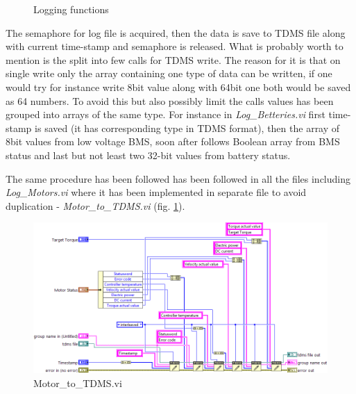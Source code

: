 \begin{figure}[h]\ContinuedFloat
    \centering
    \renewcommand{\thesubfigure}{}%
    \tightsubcaptions %
    \setlength{\subfloatlabelskip}{0pt}%
    \caption{Logging functions}
\end{figure}
The semaphore for log file is acquired, then the data is save to TDMS file along with current time-stamp and semaphore is released. What is probably worth to mention is the split into few calls for TDMS write. The reason for it is that on single write only the array containing one type of data can be written, if one would try for instance write 8bit value along with 64bit one both would be saved as 64 numbers. To avoid this but also possibly limit the calls values has been grouped into arrays of the same type. For instance in \textit{Log\_Betteries.vi} first time-stamp is saved (it has corresponding type in TDMS format), then the array of 8bit values from low voltage BMS, soon after follows Boolean array from BMS status and last but not least two 32-bit values from battery status.

The same procedure has been followed has been followed in all the files including \textit{Log\_Motors.vi} where it has been implemented in separate file to avoid duplication - \textit{Motor\_to\_TDMS.vi} (fig. \ref{vi:Motor_to_TDMS}).
\begin{figure}[H]
    \centering
    \includegraphics[scale=\visc,max width=\textwidth]{figures/Motor_to_TDMSd}
    \caption{Motor\_to\_TDMS.vi}
    \label{vi:Motor_to_TDMS}
\end{figure}

